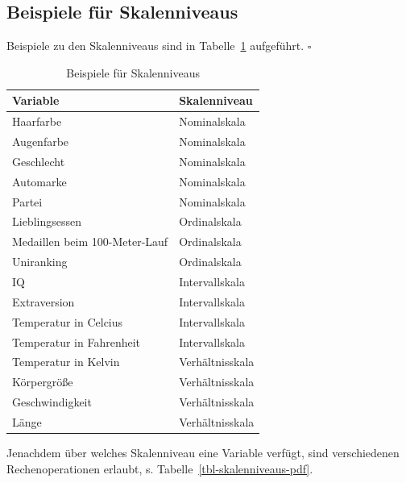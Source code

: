 \documentclass[
  a4paper,
  DIV=11]{scrreprt}
\theoremstyle{definition}
\theoremstyle{definition}
\theoremstyle{definition}
\theoremstyle{remark}
\begin{document}
\subsection{Beispiele für
Skalenniveaus}\label{beispiele-fuxfcr-skalenniveaus}

Beispiele zu den Skalenniveaus sind in Tabelle~\ref{tbl-skalen-bsps}
aufgeführt. \(\square\)

\begin{longtable}[]{@{}ll@{}}

\caption{\label{tbl-skalen-bsps}Beispiele für Skalenniveaus}

\tabularnewline

\toprule\noalign{}
Variable & Skalenniveau \\
\midrule\noalign{}
\endhead
\bottomrule\noalign{}
\endlastfoot
Haarfarbe & Nominalskala \\
Augenfarbe & Nominalskala \\
Geschlecht & Nominalskala \\
Automarke & Nominalskala \\
Partei & Nominalskala \\
Lieblingsessen & Ordinalskala \\
Medaillen beim 100-Meter-Lauf & Ordinalskala \\
Uniranking & Ordinalskala \\
IQ & Intervallskala \\
Extraversion & Intervallskala \\
Temperatur in Celcius & Intervallskala \\
Temperatur in Fahrenheit & Intervallskala \\
Temperatur in Kelvin & Verhältnisskala \\
Körpergröße & Verhältnisskala \\
Geschwindigkeit & Verhältnisskala \\
Länge & Verhältnisskala \\

\end{longtable}

Jenachdem über welches Skalenniveau eine Variable verfügt, sind
verschiedenen Rechenoperationen erlaubt, s.
{Tabelle~\ref{tbl-skalenniveaus-pdf}}.
\end{document}
